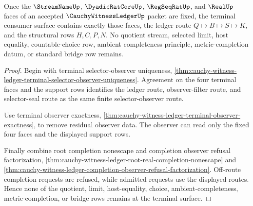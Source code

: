 \begin{theorem}
\label{thm:cauchy-witness-ledger-terminal-four-face-refusal-exactness}
Once the $\StreamNameUp$, $\DyadicRatCoreUp$, $\RegSeqRatUp$, and $\RealUp$ faces of an accepted $\CauchyWitnessLedgerUp$ packet are fixed, the terminal consumer surface contains exactly those faces, the ledger route $Q \longmapsto B \longmapsto S \longmapsto K$, and the structural rows $H,C,P,N$. No quotient stream, selected limit, host equality, countable-choice row, ambient completeness principle, metric-completion datum, or standard bridge row remains.
\end{theorem}
\begin{proof}
Begin with terminal selector-observer uniqueness, \autoref{thm:cauchy-witness-ledger-terminal-selector-observer-uniqueness}. Agreement on the four terminal faces and the support rows identifies the ledger route, observer-filter route, and selector-seal route as the same finite selector-observer route.

Use terminal observer exactness, \autoref{thm:cauchy-witness-ledger-terminal-observer-exactness}, to remove residual observer data. The observer can read only the fixed four faces and the displayed support rows.

Finally combine root completion nonescape and completion observer refusal factorization, \autoref{thm:cauchy-witness-ledger-root-real-completion-nonescape} and \autoref{thm:cauchy-witness-ledger-completion-observer-refusal-factorization}. Off-route completion requests are refused, while admitted requests use the displayed routes. Hence none of the quotient, limit, host-equality, choice, ambient-completeness, metric-completion, or bridge rows remains at the terminal surface.
\end{proof}

